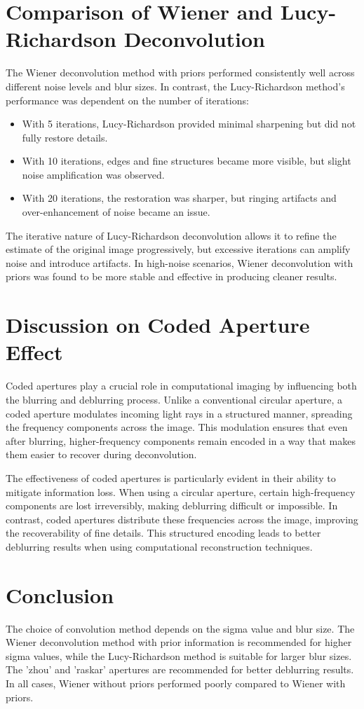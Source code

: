 \documentclass[a4paper,10pt]{article}
\begin{document}
\section{Comparison of Wiener and Lucy-Richardson Deconvolution}
The Wiener deconvolution method with priors performed consistently well across different noise levels and blur sizes. In contrast, the Lucy-Richardson method's performance was dependent on the number of iterations:
\begin{itemize}
    \item With 5 iterations, Lucy-Richardson provided minimal sharpening but did not fully restore details.
    \item With 10 iterations, edges and fine structures became more visible, but slight noise amplification was observed.
    \item With 20 iterations, the restoration was sharper, but ringing artifacts and over-enhancement of noise became an issue.
\end{itemize}
The iterative nature of Lucy-Richardson deconvolution allows it to refine the estimate of the original image progressively, but excessive iterations can amplify noise and introduce artifacts. In high-noise scenarios, Wiener deconvolution with priors was found to be more stable and effective in producing cleaner results.

\section{Discussion on Coded Aperture Effect}
Coded apertures play a crucial role in computational imaging by influencing both the blurring and deblurring process. Unlike a conventional circular aperture, a coded aperture modulates incoming light rays in a structured manner, spreading the frequency components across the image. This modulation ensures that even after blurring, higher-frequency components remain encoded in a way that makes them easier to recover during deconvolution.

The effectiveness of coded apertures is particularly evident in their ability to mitigate information loss. When using a circular aperture, certain high-frequency components are lost irreversibly, making deblurring difficult or impossible. In contrast, coded apertures distribute these frequencies across the image, improving the recoverability of fine details. This structured encoding leads to better deblurring results when using computational reconstruction techniques.

\section{Conclusion}
The choice of convolution method depends on the sigma value and blur size. The Wiener deconvolution method with prior information is recommended for higher sigma values, while the Lucy-Richardson method is suitable for larger blur sizes. The 'zhou' and 'raskar' apertures are recommended for better deblurring results. In all cases, Wiener without priors performed poorly compared to Wiener with priors. 
\end{document}
